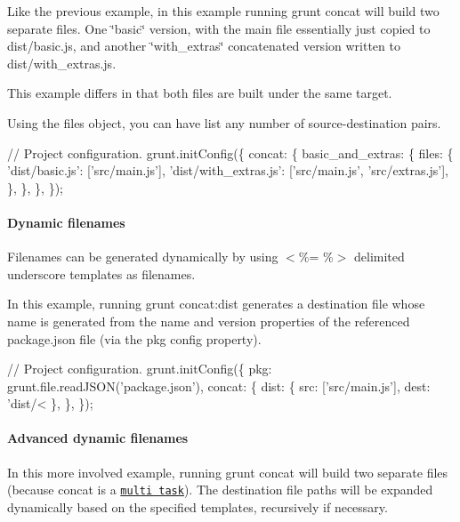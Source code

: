 Like the previous example, in this example running {\ttfamily grunt concat} will build two separate files. One \char`\"{}basic\char`\"{} version, with the main file essentially just copied to {\ttfamily dist/basic.\+js}, and another \char`\"{}with\+\_\+extras\char`\"{} concatenated version written to {\ttfamily dist/with\+\_\+extras.\+js}.

This example differs in that both files are built under the same target.

Using the {\ttfamily files} object, you can have list any number of source-\/destination pairs.


\begin{DoxyCode}
// Project configuration.
grunt.initConfig(\{
  concat: \{
    basic\_and\_extras: \{
      files: \{
        'dist/basic.js': ['src/main.js'],
        'dist/with\_extras.js': ['src/main.js', 'src/extras.js'],
      \},
    \},
  \},
\});
\end{DoxyCode}


\paragraph*{Dynamic filenames}

Filenames can be generated dynamically by using {\ttfamily $<$\%= \%$>$} delimited underscore templates as filenames.

In this example, running {\ttfamily grunt concat\+:dist} generates a destination file whose name is generated from the {\ttfamily name} and {\ttfamily version} properties of the referenced {\ttfamily package.\+json} file (via the {\ttfamily pkg} config property).


\begin{DoxyCode}
// Project configuration.
grunt.initConfig(\{
  pkg: grunt.file.readJSON('package.json'),
  concat: \{
    dist: \{
      src: ['src/main.js'],
      dest: 'dist/<%
    \},
  \},
\});
\end{DoxyCode}


\paragraph*{Advanced dynamic filenames}

In this more involved example, running {\ttfamily grunt concat} will build two separate files (because {\ttfamily concat} is a \href{http://gruntjs.com/creating-tasks#multi-tasks}{\tt multi task}). The destination file paths will be expanded dynamically based on the specified templates, recursively if necessary.

